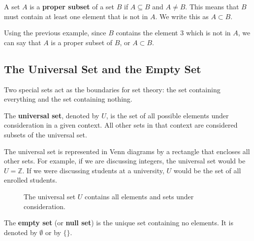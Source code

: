 \begin{definition}
    A set $A$ is a \textbf{proper subset} of a set $B$ if $A \subseteq B$ and $A \neq B$. This means that $B$ must contain at least one element that is not in $A$. We write this as $A \subset B$.
\end{definition}

Using the previous example, since $B$ contains the element $3$ which is not in $A$, we can say that $A$ is a proper subset of $B$, or $A \subset B$.

\subsection*{The Universal Set and the Empty Set}
Two special sets act as the boundaries for set theory: the set containing everything and the set containing nothing.

\begin{definition}
    The \textbf{universal set}, denoted by $U$, is the set of all possible elements under consideration in a given context. All other sets in that context are considered subsets of the universal set.
\end{definition}

The universal set is represented in Venn diagrams by a rectangle that encloses all other sets. For example, if we are discussing integers, the universal set would be $U = \mathbb{Z}$. If we were discussing students at a university, $U$ would be the set of all enrolled students.

\begin{figure}[htbp]
    \centering
    \caption{The universal set $U$ contains all elements and sets under consideration.}
    \label{fig:universal_set}
\end{figure}

\begin{definition}
    The \textbf{empty set} (or \textbf{null set}) is the unique set containing no elements. It is denoted by $\emptyset$ or by $\{\}$.
\end{definition}

